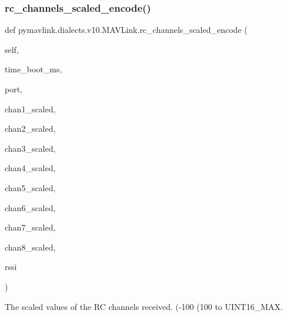 \begin{DoxyVerb}
\begin{DoxyVerb}
\begin{DoxyVerb}
\begin{DoxyVerb}
\begin{DoxyVerb}
\begin{DoxyVerb}
\begin{DoxyVerb}
\subsubsection{\texorpdfstring{rc\+\_\+channels\+\_\+scaled\+\_\+encode()}{rc\_channels\_scaled\_encode()}}
{\footnotesize\ttfamily def pymavlink.\+dialects.\+v10.\+M\+A\+V\+Link.\+rc\+\_\+channels\+\_\+scaled\+\_\+encode (\begin{DoxyParamCaption}\item[{}]{self,  }\item[{}]{time\+\_\+boot\+\_\+ms,  }\item[{}]{port,  }\item[{}]{chan1\+\_\+scaled,  }\item[{}]{chan2\+\_\+scaled,  }\item[{}]{chan3\+\_\+scaled,  }\item[{}]{chan4\+\_\+scaled,  }\item[{}]{chan5\+\_\+scaled,  }\item[{}]{chan6\+\_\+scaled,  }\item[{}]{chan7\+\_\+scaled,  }\item[{}]{chan8\+\_\+scaled,  }\item[{}]{rssi }\end{DoxyParamCaption})}

\begin{DoxyVerb}The scaled values of the RC channels received. (-100%
(100%
to UINT16_MAX.


\end{DoxyVerb}
\end{DoxyVerb}
\end{DoxyVerb}
\end{DoxyVerb}
\end{DoxyVerb}
\end{DoxyVerb}
\end{DoxyVerb}
\end{DoxyVerb}
